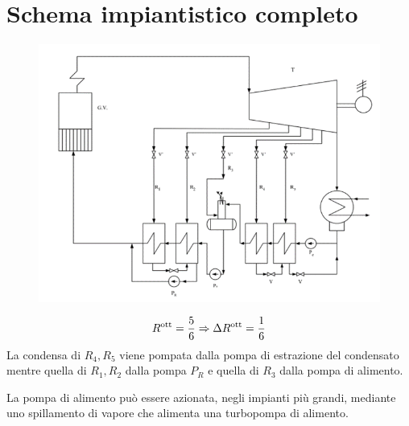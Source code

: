 \section{Schema impiantistico completo}
	\begin{figure}[H]
		\centering
		\includegraphics[width=1\linewidth]{immagini/impiantovapore}
		\label{fig:impiantovapore}
	\end{figure}	
\begin{adjustwidth}{2in}{}
	\[R^\text{ott} = {5\over6}\Rightarrow\Delta R^\text{ott} = {1\over6}\]
	La condensa di $R_4,R_5$ viene pompata dalla pompa di estrazione del condensato mentre quella di $R_1, R_2$ dalla pompa $P_R$ e quella di $R_3$ dalla pompa di alimento. 
	
	La  pompa  di  alimento  può essere  azionata,  negli  impianti  più grandi,  mediante uno spillamento di vapore che alimenta una turbopompa di alimento.	
\end{adjustwidth}

\newpage

